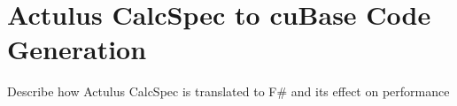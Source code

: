 \section{Actulus CalcSpec to cuBase Code Generation}
Describe how Actulus CalcSpec is translated to F\# and its effect on performance